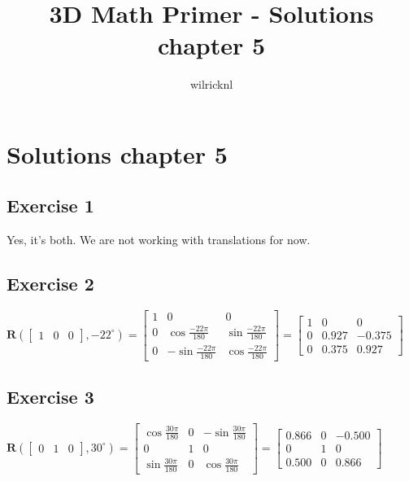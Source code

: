 \documentclass[11pt]{article}
\author{wilricknl}
\title{3D Math Primer - Solutions chapter 5}
\begin{document}
\maketitle

\section{Solutions chapter 5}

\subsection{Exercise 1}

Yes, it's both. We are not working with translations for now.

\subsection{Exercise 2}

$
\textbf{R}(\begin{bmatrix}
1 & 0 & 0
\end{bmatrix}, -22^{\circ{}})=
\begin{bmatrix}
1 & 0 & 0 \\
0 & \cos\frac{-22\pi}{180} & \sin\frac{-22\pi}{180} \\
0 & -\sin\frac{-22\pi}{180} & \cos\frac{-22\pi}{180}
\end{bmatrix}=
\begin{bmatrix}
1 & 0 & 0 \\
0 & 0.927 & -0.375 \\
0 & 0.375 & 0.927
\end{bmatrix}
$

\subsection{Exercise 3}

$
\textbf{R}(\begin{bmatrix}
0 & 1 & 0
\end{bmatrix}, 30^{\circ{}})=
\begin{bmatrix}
\cos\frac{30\pi}{180} & 0 & -\sin\frac{30\pi}{180} \\
0 & 1 & 0 \\
\sin\frac{30\pi}{180} & 0 & \cos\frac{30\pi}{180}
\end{bmatrix}=
\begin{bmatrix}
0.866 & 0 & -0.500 \\
0 & 1 & 0 \\
0.500 & 0 & 0.866
\end{bmatrix}
$
\end{document}
